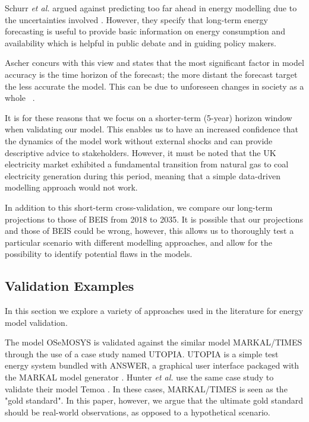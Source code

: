 Schurr \textit{et al.} argued against predicting too far ahead in energy modelling due to the uncertainties involved \cite{Schurr_1961}. However, they specify that long-term energy forecasting is useful to provide basic information on energy consumption and availability which is helpful in public debate and in guiding policy makers.


Ascher concurs with this view and states that the most significant factor in model accuracy is the time horizon of the forecast; the more distant the forecast target the less accurate the model. This can be due to unforeseen changes in society as a whole ~\cite{gillespie_1979}.

It is for these reasons that we focus on a shorter-term (5-year) horizon window when validating our model. This enables us to have an increased confidence that the dynamics of the model work without external shocks and can provide descriptive advice to stakeholders. However, it must be noted that the UK electricity market exhibited a fundamental transition from natural gas to coal electricity generation during this period, meaning that a simple data-driven modelling approach would not work.

In addition to this short-term cross-validation, we compare our long-term projections to those of BEIS from 2018 to 2035. It is possible that our projections and those of BEIS could be wrong, however, this allows us to thoroughly test a particular scenario with different modelling approaches, and allow for the possibility to identify potential flaws in the models.


\subsection{Validation Examples}

In this section we explore a variety of approaches used in the literature for energy model validation.

The model OSeMOSYS \cite{Howells2011} is validated against the similar model MARKAL\slash TIMES through the use of a case study named UTOPIA. UTOPIA is a simple test energy system bundled with ANSWER, a graphical user interface packaged with the MARKAL model generator \cite{Hunter2013, Noble2004}. Hunter \textit{et al.} use the same case study to validate their model Temoa \cite{Hunter2013}. In these cases, MARKAL\slash TIMES is seen as the "gold standard". In this paper, however, we argue that the ultimate gold standard should be real-world observations, as opposed to a hypothetical scenario.

